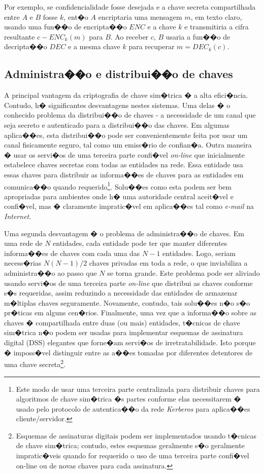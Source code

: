 \documentclass[a4paper,capchap,espacoduplo,normaltoc]{abntepusp}
\begin{document}
Por exemplo, se confidencialidade fosse desejada e a chave secreta compartilhada entre $A$ e $B$ fosse $k$, ent�o $A$ encriptaria uma mensagem $m$, em texto claro, usando uma fun��o de encripta��o $ENC$ e a chave $k$ e transmitiria a cifra resultante $c - ENC_{k}(m)$ para $B$. Ao receber $c$, $B$ usaria a fun��o de decripta��o $DEC$ e a mesma chave $k$ para recuperar $m = DEC_{k}(c)$. 


\subsection{Administra��o e distribui��o de chaves}

A principal vantagem da criptografia de chave sim�trica � a alta efici�ncia. Contudo, h� significantes desvantagens nestes sistemas. Uma delas � o conhecido problema da distribui��o de chaves - a necessidade de um canal que seja secreto e autenticado para a distribui��o das chaves. Em algumas aplica��es, esta distribui��o pode ser convenientemente feita por usar um canal fisicamente seguro, tal como um emiss�rio de confian�a. Outra maneira � usar os servi�os de uma terceira parte confi�vel \emph{on-line} que inicialmente estabelece chaves secretas com todas as entidades na rede. Essa entidade usa essas chaves para distribuir as informa��es de chaves para as entidades em comunica��o quando requerido\footnote{Este modo de usar uma terceira parte centralizada para distribuir chaves para algoritmos de chave sim�trica �s partes conforme elas necessitarem � usado pelo protocolo de autentica��o da rede \emph{Kerberos} para aplica��es cliente/servidor.}. Solu��es como esta podem ser bem apropriadas para ambientes onde h� uma autoridade central aceit�vel e confi�vel, mas � claramente impratic�vel em aplica��es tal como \emph{e-mail} na \emph{Internet}.

Uma segunda desvantagem � o problema de administra��o de chaves. Em uma rede de $N$ entidades, cada entidade pode ter que manter diferentes informa��es de chaves com cada uma das $N-1$ entidades. Logo, seriam necess�rias $N(N-1)/2$ chaves privadas em toda a rede, o que inviabiliza a administra��o ao passo que $N$ se torna grande. Este problema pode ser aliviado usando servi�os de uma terceira parte \emph{on-line} que distribui as chaves conforme s�s requeridas, assim reduzindo a necessidade das entidades de armazenar m�ltiplas chaves seguramente. Novamente, contudo, tais solu��es n�o s�o pr�ticas em alguns cen�rios. Finalmente, uma vez que a informa��o sobre as chaves � compartilhada entre duas (ou mais) entidades, t�cnicas de chave sim�trica n�o podem ser usadas para implementar esquemas de assinatura digital (DSS) elegantes que forne�am servi�os de irretratabilidade. Isto porque � imposs�vel distinguir entre as a��es tomadas por diferentes detentores de uma chave secreta\footnote{Esquemas de assinaturas digitais podem ser implementados usando t�cnicas de chave sim�trica; contudo, estes esquemas geralmente s�o geralmente impratic�veis quando for requerido o uso de uma terceira parte confi�vel on-line ou de novas chaves para cada assinatura.}.\cite{menezes}
\end{document}
